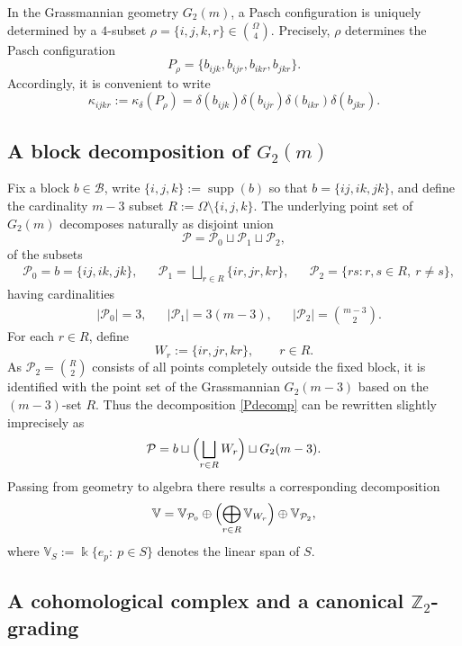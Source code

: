 \documentclass[times,11pt,reqno]{amsproc}
\theoremstyle{definition}
\numberwithin{equation}{section}
\newcommand\fie{\Bbbk}
\def\valg{\mathbb{V}}
\DeclareMathOperator{\supp}{supp}
\begin{document}
In the Grassmannian geometry $G_2(m)$, a Pasch configuration is uniquely determined by a $4$-subset
$\rho = \{i,j,k,r\}\in\binom{\Omega}{4}$. Precisely, $\rho$ determines the Pasch configuration
$$
P_\rho
=
\{
b_{ijk},
b_{ijr},
b_{ikr},
b_{jkr}
\}.
$$
Accordingly, it is convenient to write
\begin{equation}\label{kappaijkr}
\kappa_{ijkr}
:=
\kappa_\delta(P_\rho)
=
\delta(b_{ijk})
\delta(b_{ijr})
\delta(b_{ikr})
\delta(b_{jkr}).
\end{equation}




\subsection{A block decomposition of $G_2(m)$}\label{sec:proof}
Fix a block $b\in\mathcal B$, write $\{i,j,k\}:=\supp(b)$ so that $b=\{ij,ik,jk\}$, and define the cardinality $m-3$ subset $R:=\Omega\setminus\{i,j,k\}$. The underlying point set of $G_2(m)$ decomposes naturally as disjoint union
\begin{equation}\label{Pdecomp}
\mathcal{P}
=
\mathcal{P}_0
\sqcup
\mathcal{P}_1
\sqcup
\mathcal{P}_2,
\end{equation}
of the subsets
\begin{align*}
&\mathcal{P}_0=
b
=
\{ij,ik,jk\},&
&\mathcal{P}_1=
\bigsqcup_{r\in R}
\{ir,jr,kr\},
&&
\mathcal{P}_2=
\{rs:r,s\in R,\ r\ne s\},
\end{align*}
having cardinalities
\begin{align*}
&|\mathcal{P}_0|=3,&&
|\mathcal{P}_1|=3(m-3),&&
|\mathcal{P}_2|=\binom{m-3}{2}.
\end{align*}
For each $r\in R$, define
$$
W_r:=\{ir,jr,kr\},
\qquad
r\in R.
$$
As $\mathcal{P}_2 =
\binom{R}{2}$ consists of all points completely outside the fixed block, it is identified with the point set of the Grassmannian
$G_2(m-3)$ based on the $(m-3)$-set $R$. Thus the decomposition \eqref{Pdecomp} can be rewritten slightly imprecisely as
$$
\mathcal{P}
=
b
\sqcup
\Bigl(
\bigsqcup_{r\in R}W_r
\Bigr)
\sqcup
G_2(m-3).
$$
Passing from geometry to algebra there results a corresponding decomposition
\begin{equation}\label{Vdecomp}
\valg
=
\valg_{\mathcal{P}_0}
\oplus
\Bigl(
\bigoplus_{r\in R}\valg_{W_r}
\Bigr)
\oplus
\valg_{\mathcal{P}_2},
\end{equation}
where
$\valg_S
:=
\fie\{ e_p:\ p\in S\}$
denotes the linear span of $S$.


\subsection{A cohomological complex and a canonical $\mathbb Z_2$-grading}\label{sec:d-complex}
\end{document}
